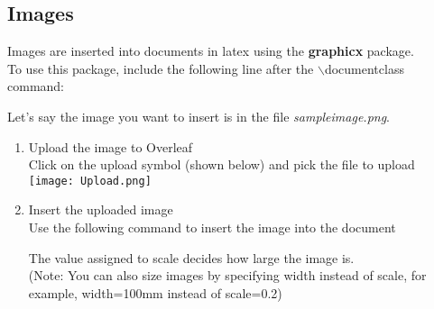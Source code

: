 \documentclass[11pt,onecolumn]{article}
\theoremstyle{definition}
\begin{document}
\subsection{Images}
Images are inserted into documents in latex using the \textbf{graphicx} package. \\
To use this package, include the following line after the $\backslash$documentclass command: 
\begin{tcolorbox}
\end{tcolorbox}
Let's say the image you want to insert is in the file \textit{sampleimage.png}. 
\begin{enumerate}
    \item Upload the image to Overleaf \\
    Click on the upload symbol (shown below) and pick the file to upload \\
    \texttt{[image: Upload.png]}
    \item Insert the uploaded image \\
    Use the following command to insert the image into the document
    \begin{tcolorbox}
    \end{tcolorbox}
    The value assigned to scale decides how large the image is. \\
    (Note: You can also size images by specifying width instead of scale, for example, width=100mm instead of scale=0.2)
\end{enumerate}
\end{document}
